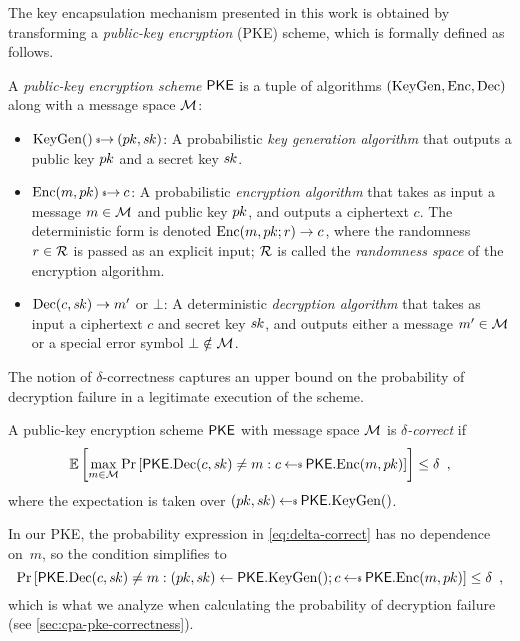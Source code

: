 The key encapsulation mechanism presented in this work is obtained by transforming a \emph{public-key encryption} (PKE) scheme, which is formally defined as follows.

\begin{definition}
  A \emph{public-key encryption scheme} $\textsf{\upshape\mdseries PKE}$ is a tuple of
  algorithms $(\textrm{\upshape\mdseries KeyGen},\textrm{\upshape\mdseries Enc},\textrm{\upshape\mdseries Dec})$ along with a message space
  $\mathcal{M}$:
\begin{itemize}
\item $\KeyGen() \tor (\pk, \sk)$: A probabilistic \emph{key generation algorithm} that outputs a public key $p\mkern-0.5muk$ and a secret key $s\mkern-1muk$.
\item $\Enc(m, \pk) \tor c$: A probabilistic \emph{encryption
    algorithm} that takes as input a message $m \in \mathcal{M}$ and public
  key $p\mkern-0.5muk$, and outputs a ciphertext $c$.  The deterministic form is
  denoted $\textrm{\upshape\mdseries Enc}(m, p\mkern-0.5muk; r) \to c$, where the randomness
  $r \in \mathcal{R}$ is passed as an explicit input; $\mathcal{R}$ is called
  the \emph{randomness space} of the encryption algorithm.
\item $\textrm{\upshape\mdseries Dec}(c, s\mkern-1muk) \to m'$ or $\bot$: A deterministic
  \emph{decryption algorithm} that takes as input a ciphertext $c$ and
  secret key $s\mkern-1muk$, and outputs either a message $m' \in \mathcal{M}$ or a
  special error symbol $\bot \notin \mathcal{M}$.
\end{itemize}
\end{definition}

The notion of $\delta$-correctness captures an upper bound on the
probability of decryption failure in a legitimate execution of the
scheme.
\begin{definition}
  \label{def:delta-correct}
  A public-key encryption scheme $\textsf{\upshape\mdseries PKE}$ with message space $\mathcal{M}$ is
  \emph{$\delta$-correct} if
  \begin{equation}
    \label{eq:delta-correct}
    \E\left[ \max_{m \in \MsgSp} \Pr\left[ \PKE.\Dec(c, \sk)
        \neq m : c \getsr \PKE.\Enc(m, \pk) \right] \right] \leq
    \delta \enspace,
  \end{equation}
  where the expectation is taken over
  $(\pk, \sk) \getsr \PKE.\KeyGen()$.
\end{definition}
In our PKE, the probability expression in
\autoref{eq:delta-correct} has no dependence on~$m$, so the
condition simplifies to
\begin{equation}
  \label{eq:simpler-delta-correct}
  \Pr\left[ \PKE.\Dec(c, \sk)
    \neq m : (\pk, \sk) \gets \PKE.\KeyGen(); c \getsr \PKE.\Enc(m,
    \pk) \right]  \leq \delta \enspace ,
\end{equation}
which is what we analyze when calculating the probability of
decryption failure (see \autoref{sec:cpa-pke-correctness}).

